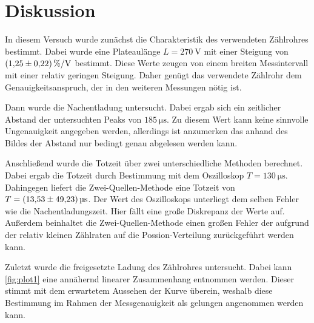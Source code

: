 \section{Diskussion}
\label{sec:Diskussion}
In diesem Versuch wurde zunächst die Charakteristik des verwendeten Zählrohres bestimmt. Dabei wurde eine Plateaulänge $L = \qty{270}{\volt}$ mit einer Steigung von 
$\qty{1.25+-0.22}{\percent\per\volt}$ bestimmt. Diese Werte zeugen von einem breiten Messintervall mit einer relativ geringen Steigung. Daher genügt das verwendete 
Zählrohr dem Genauigkeitsanspruch, der in den weiteren Messungen nötig ist.

Dann wurde die Nachentladung untersucht. Dabei ergab sich ein zeitlicher Abstand der untersuchten Peaks von $\qty{185}{\micro\second}$. Zu diesem Wert kann keine sinnvolle
Ungenauigkeit angegeben werden, allerdings ist anzumerken das anhand des Bildes der Abstand nur bedingt genau abgelesen werden kann.  

Anschließend wurde die Totzeit über zwei unterschiedliche Methoden berechnet. Dabei ergab die Totzeit durch Bestimmung mit dem Oszilloskop $T = \qty{130}{\micro\second}$. Dahingegen
liefert die Zwei-Quellen-Methode eine Totzeit von $T = \qty{13.53 +-49.23}{\micro\second}$. Der Wert des Oszilloskops unterliegt dem selben Fehler wie die Nachentladungszeit.
Hier fällt eine große Diskrepanz der Werte auf. Außerdem beinhaltet die Zwei-Quellen-Methode einen großen Fehler der aufgrund der relativ kleinen Zählraten auf die 
Possion-Verteilung zurückgeführt werden kann.

Zuletzt wurde die freigesetzte Ladung des Zählrohres untersucht. Dabei kann \autoref{fig:plot1} eine annähernd linearer Zusammenhang entnommen werden. Dieser stimmt mit 
dem erwartetem Aussehen der Kurve überein, weshalb diese Bestimmung im Rahmen der Messgenauigkeit als gelungen angenommen werden kann.

